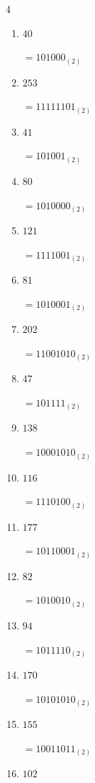 \begin{multicols}{4}
\begin{enumerate}
        $=10000011_{(2)}$

  \item $40$

        $=101000_{(2)}$

  \item $253$

        $=11111101_{(2)}$

  \item $41$

        $=101001_{(2)}$

  \item $80$

        $=1010000_{(2)}$

  \item $121$

        $=1111001_{(2)}$

\columnbreak %

\resetques

  \item $81$

        $=1010001_{(2)}$

  \item $202$

        $=11001010_{(2)}$

  \item $47$

        $=101111_{(2)}$

  \item $138$

        $=10001010_{(2)}$

  \item $116$

        $=1110100_{(2)}$

  \item $177$

        $=10110001_{(2)}$

  \item $82$

        $=1010010_{(2)}$

  \item $94$

        $=1011110_{(2)}$

  \item $170$

        $=10101010_{(2)}$

  \item $155$

        $=10011011_{(2)}$

  \item $102$


\end{enumerate}
\end{multicols}
